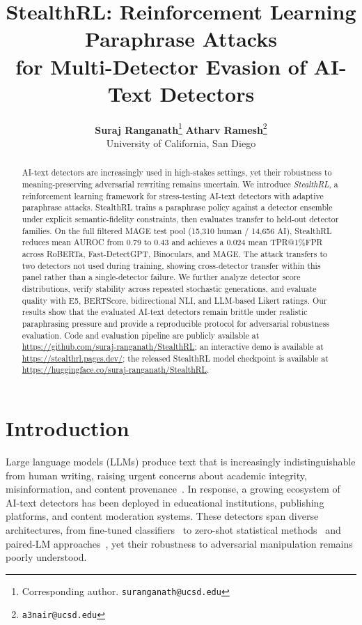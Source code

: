 \documentclass[11pt]{article}
\title{\textbf{StealthRL: Reinforcement Learning Paraphrase Attacks\\for Multi-Detector Evasion of AI-Text Detectors}}
\author{
  \textbf{Suraj Ranganath}\thanks{Corresponding author. \texttt{suranganath@ucsd.edu}} \quad
  \textbf{Atharv Ramesh}\thanks{\texttt{a3nair@ucsd.edu}} \\[4pt]
  University of California, San Diego
}
\date{}
\begin{document}
\maketitle

\begin{abstract}
\sloppy
AI-text detectors are increasingly used in high-stakes settings, yet their robustness to meaning-preserving adversarial rewriting remains uncertain. We introduce \emph{StealthRL}, a reinforcement learning framework for stress-testing AI-text detectors with adaptive paraphrase attacks. StealthRL trains a paraphrase policy against a detector ensemble under explicit semantic-fidelity constraints, then evaluates transfer to held-out detector families. On the full filtered MAGE test pool (15,310 human / 14,656 AI), StealthRL reduces mean AUROC from 0.79 to 0.43 and achieves a 0.024 mean TPR@1\%FPR across RoBERTa, Fast-DetectGPT, Binoculars, and MAGE. The attack transfers to two detectors not used during training, showing cross-detector transfer within this panel rather than a single-detector failure. We further analyze detector score distributions, verify stability across repeated stochastic generations, and evaluate quality with E5, BERTScore, bidirectional NLI, and LLM-based Likert ratings. Our results show that the evaluated AI-text detectors remain brittle under realistic paraphrasing pressure and provide a reproducible protocol for adversarial robustness evaluation. Code and evaluation pipeline are publicly available at \url{https://github.com/suraj-ranganath/StealthRL}; an interactive demo is available at \url{https://stealthrl.pages.dev/}; the released StealthRL model checkpoint is available at \url{https://huggingface.co/suraj-ranganath/StealthRL}.
\end{abstract}

\section{Introduction}
\label{sec:intro}

Large language models (LLMs) produce text that is increasingly indistinguishable from human writing, raising urgent concerns about academic integrity, misinformation, and content provenance~\cite{solaiman2019release}. In response, a growing ecosystem of AI-text detectors has been deployed in educational institutions, publishing platforms, and content moderation systems. These detectors span diverse architectures, from fine-tuned classifiers~\cite{solaiman2019release} to zero-shot statistical methods~\cite{mitchell2023detectgptzeroshotmachinegeneratedtext, bao2024fastdetectgptefficientzeroshotdetection} and paired-LM approaches~\cite{hans2024spottingllmsbinocularszeroshot}, yet their robustness to adversarial manipulation remains poorly understood.
\end{document}
